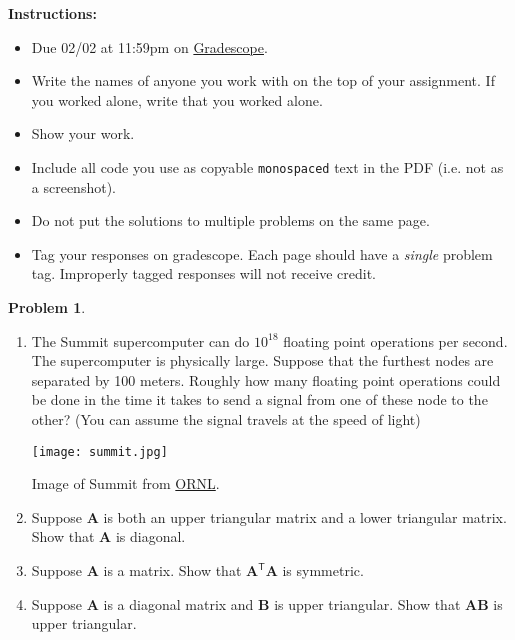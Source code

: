 \documentclass[12pt]{article}
\theoremstyle{definition}
\newtheorem{problem}{Problem}
\renewcommand{\vec}{\mathbf}
\newcommand{\T}{\mathsf{T}}
\begin{document}
    \textbf{\Large{}}
    
    \vspace{-1.8em}
    \hrulefill
 
\textbf{Instructions:}
    \begin{itemize}
        \item Due 02/02 at 11:59pm on \href{https://www.gradescope.com/courses/487363/}{Gradescope}.
        \item Write the names of anyone you work with on the top of your assignment. If you worked alone, write that you worked alone.
        \item Show your work.
        \item Include all code you use as copyable \verb|monospaced| text in the PDF (i.e. not as a screenshot).
        \item Do not put the solutions to multiple problems on the same page.
        \item Tag your responses on gradescope. Each page should have a \emph{single} problem tag. Improperly tagged responses will not receive credit.
\end{itemize}
    
\vspace{1em}

\begin{problem}~
    \begin{enumerate}
        \item The Summit supercomputer can do $10^{18}$ floating point operations per second.
            The supercomputer is physically large. 
            Suppose that the furthest nodes are separated by 100 meters.
            Roughly how many floating point operations could be done in the time it takes to send a signal from one of these node to the other? (You can assume the signal travels at the speed of light)
            \begin{center}
                \texttt{[image: summit.jpg]}
                
                Image of Summit from \href{https://www.flickr.com/photos/olcf/49912253043/in/album-72157683655708262/}{ORNL}.
            \end{center}
        \item Suppose $\vec{A}$ is both an upper triangular matrix and a lower triangular matrix. Show that $\vec{A}$ is diagonal.
        \item Suppose $\vec{A}$ is a matrix. Show that $\vec{A}^\T \vec{A}$ is symmetric.
        \item Suppose $\vec{A}$ is a diagonal matrix and $\vec{B}$ is upper triangular. Show that $\vec{A}\vec{B}$ is upper triangular.
    \end{enumerate}
\end{problem}
\end{document}
